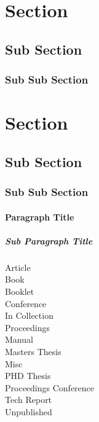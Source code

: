 
    \section{Section}\label{sec:section}
    \lipsum[1-1]
    \subsection{Sub Section}\label{subsec:sub-section}
    \lipsum[2-3]
    \subsubsection{Sub Sub Section}\label{subsubsec:sub-sub-section}
    \lipsum[4-4]

    \section*{Section}\label{sec:sectionnoenumerate}
    \lipsum[1-1]
    \subsection*{Sub Section}\label{subsec:sub-sectionnoenumerate}
    \lipsum[2-3]
    \subsubsection*{Sub Sub Section}
    \lipsum[4-4]

    \paragraph{Paragraph Title}\label{par:paragraph-title}
    \lipsum[4-4]
    \subparagraph{Sub Paragraph Title}\label{subpar:sub-paragraph-title}
    \lipsum[4-4]

    \break
    \noindent
    Article~\autocite{CitekeyArticle} \\
    Book~\autocite{CitekeyBook} \\
    Booklet~\autocite{CitekeyBooklet} \\
    Conference~\autocite{CitekeyInbook} \\
    In Collection~\autocite{CitekeyIncollection} \\
    Proceedings~\autocite{CitekeyInproceedings} \\
    Manual~\autocite{CitekeyManual} \\
    Masters Thesis~\autocite{CitekeyMastersthesis} \\
    Misc~\autocite{CitekeyMisc} \\
    PHD Thesis~\autocite{CitekeyPhdthesis} \\
    Proceedings Conference~\autocite{CitekeyProceedings} \\
    Tech Report~\autocite{CitekeyTechreport} \\
    Unpublished~\autocite{CitekeyUnpublished} \\


